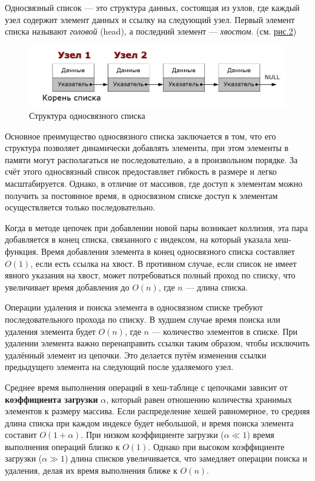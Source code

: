 \documentclass[11pt,a4paper,final]{article} %
\begin{document}
Односвязный список — это структура данных, состоящая из узлов, где каждый узел содержит элемент данных и ссылку на следующий узел. Первый элемент списка называют \textit{головой} (head), а последний элемент — \textit{хвостом}. (см. \hyperref[fig:pic1]{рис.2})

\begin{figure}[H]
	\centering
	\includegraphics[width=0.8\linewidth]{img/pic1.png}
	\caption{Структура односвязного списка}
	\label{fig:pic1}
\end{figure}

Основное преимущество односвязного списка заключается в том, что его структура позволяет динамически добавлять элементы, при этом элементы в памяти могут располагаться не последовательно, а в произвольном порядке. За счёт этого односвязный список предоставляет гибкость в размере и легко масштабируется. Однако, в отличие от массивов, где доступ к элементам можно получить за постоянное время, в односвязном списке доступ к элементам осуществляется только последовательно.

Когда в методе цепочек при добавлении новой пары возникает коллизия, эта пара добавляется в конец списка, связанного с индексом, на который указала хеш-функция. Время добавления элемента в конец односвязного списка составляет $O(1)$, если есть ссылка на хвост. В противном случае, если список не имеет явного указания на хвост, может потребоваться полный проход по списку, что увеличивает время добавления до $O(n)$, где $n$ — длина списка.

Операции удаления и поиска элемента в односвязном списке требуют последовательного прохода по списку. В худшем случае время поиска или удаления элемента будет $O(n)$, где $n$ — количество элементов в списке. При удалении элемента важно перенаправить ссылки таким образом, чтобы исключить удалённый элемент из цепочки. Это делается путём изменения ссылки предыдущего элемента на следующий после удаляемого узел.

Среднее время выполнения операций в хеш-таблице с цепочками зависит от \textbf{коэффициента загрузки} $\alpha$, который равен отношению количества хранимых элементов к размеру массива. Если распределение хешей равномерное, то средняя длина списка при каждом индексе будет небольшой, и время поиска элемента составит $O(1 + \alpha)$. При низком коэффициенте загрузки ($\alpha \ll 1$) время выполнения операций близко к $O(1)$. Однако при высоком коэффициенте загрузки ($\alpha \gg 1$) длина списков увеличивается, что замедляет операции поиска и удаления, делая их время выполнения ближе к $O(n)$.
\end{document}
